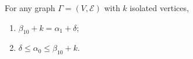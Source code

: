 For any graph $\Gamma = (V, \mathcal{E})$ with $k$ isolated vertices,
\begin{enumerate}
\item[(a)] $\beta_{10} + k = \alpha_1 + \delta$;
\item[(b)] $\delta \leq \alpha_0 \leq \beta_{10} + k$.
\end{enumerate}
